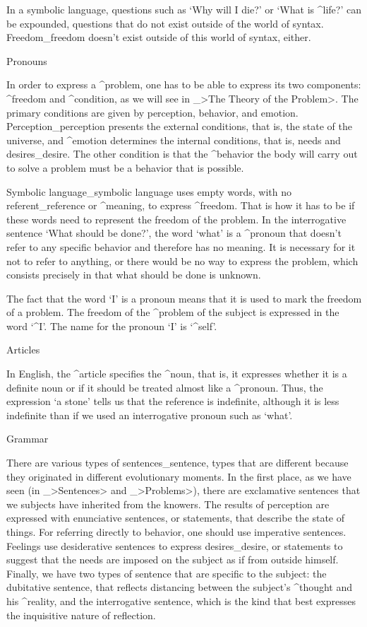In a symbolic language, questions such as `Why will I die?' or `What is
^{life}?' can be expounded, questions that do not exist outside of the
world of syntax. Freedom_{freedom} doesn't exist outside of this world
of syntax, either.


\Section Pronouns

In order to express a ^{problem}, one has to be able to express its two
components: ^{freedom} and ^{condition}, as we will see in _>The Theory
of the Problem>. The primary conditions are given by perception,
behavior, and emotion. Perception_{perception} presents the external
conditions, that is, the state of the universe, and ^{emotion}
determines the internal conditions, that is, needs and desires_{desire}.
The other condition is that the ^{behavior} the body will carry out to
solve a problem must be a behavior that is possible.

Symbolic language_{symbolic language} uses empty words, with no
referent_{reference} or ^{meaning}, to express ^{freedom}. That is how
it has to be if these words need to represent the freedom of the
problem. In the interrogative sentence `What should be done?', the word
`what' is a ^{pronoun} that doesn't refer to any specific behavior and
therefore has no meaning. It is necessary for it not to refer to
anything, or there would be no way to express the problem, which
consists precisely in that what should be done is unknown.

The fact that the word `I' is a pronoun means that it is used to mark
the freedom of a problem. The freedom of the ^{problem of the subject}
is expressed in the word `^{I}'. The name for the pronoun `I' is
`^{self}'.


\Section Articles

In English, the ^{article} specifies the ^{noun}, that is, it expresses
whether it is a definite noun or if it should be treated almost like a
^{pronoun}. Thus, the expression `a stone' tells us that the reference
is indefinite, although it is less indefinite than if we used an
interrogative pronoun such as `what'.


\Section Grammar

There are various types of sentences_{sentence, types} that are
different because they originated in different evolutionary moments. In
the first place, as we have seen (in _>Sentences> and _>Problems>),
there are exclamative
sentences that we subjects have inherited from the knowers. The results
of perception are expressed with enunciative sentences, or statements,
that describe the state of things. For referring directly to behavior,
one should use imperative sentences. Feelings use desiderative sentences
to express desires_{desire}, or statements to suggest that the needs are
imposed on the subject as if from outside himself. Finally, we have two
types of sentence that are specific to the subject: the dubitative
sentence, that reflects distancing between the subject's ^{thought} and
his ^{reality}, and the interrogative sentence, which is the kind that
best expresses the inquisitive nature of reflection.

